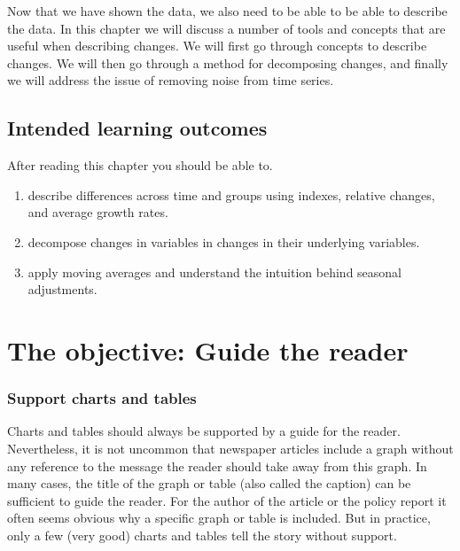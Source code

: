 \documentclass[
]{book}
\providecommand{\tightlist}{%
  \setlength{\itemsep}{0pt}\setlength{\parskip}{0pt}}
\begin{document}
Now that we have shown the data, we also need to be able to be able to describe the data. In this chapter we will discuss a number of tools and concepts that are useful when describing changes. We will first go through concepts to describe changes. We will then go through a method for decomposing changes, and finally we will address the issue of removing noise from time series.

\hypertarget{intended-learning-outcomes-8}{%
\subsection*{Intended learning outcomes}\label{intended-learning-outcomes-8}}

After reading this chapter you should be able to.

\begin{enumerate}
\def\labelenumi{\arabic{enumi}.}
\tightlist
\item
  describe differences across time and groups using indexes, relative changes, and average growth rates.
\item
  decompose changes in variables in changes in their underlying variables.
\item
  apply moving averages and understand the intuition behind seasonal adjustments.
\end{enumerate}

\hypertarget{the-objective-guide-the-reader}{%
\section{The objective: Guide the reader}\label{the-objective-guide-the-reader}}

\hypertarget{support-charts-and-tables}{%
\subsubsection*{Support charts and tables}\label{support-charts-and-tables}}

Charts and tables should always be supported by a guide for the reader. Nevertheless, it is not uncommon that newspaper articles include a graph without any reference to the message the reader should take away from this graph. In many cases, the title of the graph or table (also called the caption) can be sufficient to guide the reader. For the author of the article or the policy report it often seems obvious why a specific graph or table is included. But in practice, only a few (very good) charts and tables tell the story without support.
\end{document}
